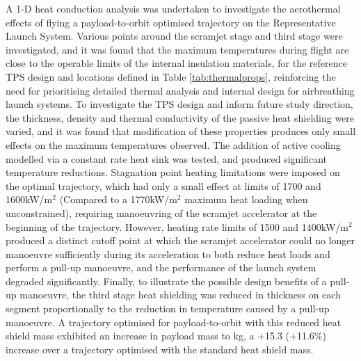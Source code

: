 	A 1-D heat conduction analysis was undertaken to investigate the aerothermal effects of flying a payload-to-orbit optimised trajectory on the Representative Launch System. 
	Various points around the scramjet stage and third stage were investigated, and it was found that the maximum temperatures during flight are close to the operable limits of the internal insulation materials, for the reference TPS design and locations defined in Table \ref{tab:thermalprops}, reinforcing the need for prioritising detailed thermal analysis and internal design for airbreathing launch systems. 
	To investigate the TPS design and inform future study direction, the thickness, density and thermal conductivity of the passive heat shielding were varied, and it was found that modification of these properties produces only small effects on the maximum temperatures observed. The addition of active cooling modelled via a constant rate heat sink was tested, and produced significant temperature reductions. 
	Stagnation point heating limitations were imposed on the optimal trajectory, which had only a small effect at limits of 1700 and 1600kW/m$^2$ (Compared to a 1770kW/m$^2$ maximum heat loading when unconstrained), requiring manoeuvring of the scramjet accelerator at the beginning of the trajectory. However, heating rate limits of 1500 and 1400kW/m$^2$ produced a distinct cutoff point at which the scramjet accelerator could no longer manoeuvre sufficiently during its acceleration to both reduce heat loads and perform a pull-up manoeuvre, and the performance of the launch system degraded significantly. 
	Finally, to illustrate the possible design benefits of a pull-up manoeuvre, the third stage heat shielding was reduced in thickness on each segment proportionally to the reduction in temperature caused by a pull-up manoeuvre. A trajectory optimised for payload-to-orbit with this reduced heat shield mass exhibited an increase in payload mass to \PayloadToOrbitTPSreduced kg, a +15.3 (+11.6\%) increase over a trajectory optimised with the standard heat shield mass.
	\cleardoublepage